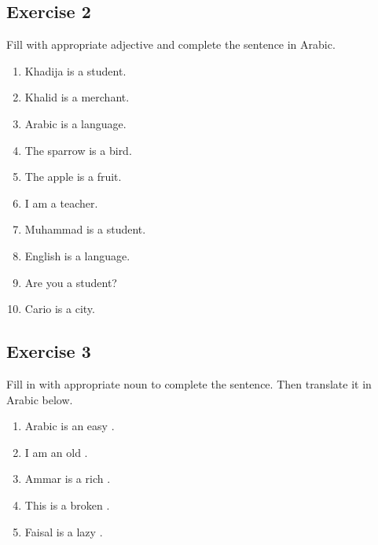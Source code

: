 \subsection{Exercise 2}
Fill with appropriate adjective and complete the sentence in Arabic.
\begin{enumerate}
    \item Khadija is a \fillin student. \\[0.1in] \answerline
    \item Khalid is a \fillin merchant. \\[0.1in] \answerline
    \item Arabic is a \fillin language. \\[0.1in] \answerline
    \item The sparrow is a \fillin bird. \\[0.1in] \answerline
    \item The apple is a \fillin fruit. \\[0.1in] \answerline
    \item I am a \fillin teacher.  \\[0.1in] \answerline
    \item Muhammad is a \fillin student. \\[0.1in] \answerline
    \item English is a \fillin language.  \\[0.1in] \answerline
    \item Are you a \fillin student?  \\[0.1in] \answerline
    \item Cario is a \fillin city. \\[0.1in] \answerline
\end{enumerate}

\subsection{Exercise 3}
Fill in with appropriate noun to complete the sentence. Then translate it in Arabic below. 
\begin{enumerate}
    \item Arabic is an easy \fillin.  \\[0.1in] \answerline 
    \item I am an old \fillin. \\[0.1in] \answerline 
    \item Ammar is a rich \fillin. \\[0.1in] \answerline 
    \item This is a broken \fillin. \\[0.1in] \answerline 
    \item Faisal is a lazy \fillin. \\[0.1in] \answerline 
\end{enumerate}


